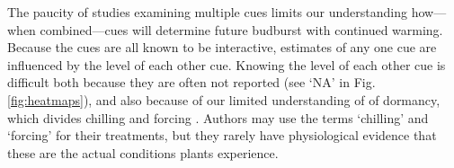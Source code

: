 \documentclass[11pt,letter]{article}
\begin{document}
The paucity of studies examining multiple cues limits our understanding how---when combined---cues will determine future budburst with continued warming. Because the cues are all known to be interactive, estimates of any one cue are influenced by the level of each other cue. Knowing the level of each other cue is difficult both because they are often not reported (see `NA' in Fig. \ref{fig:heatmaps}), and also because of our limited understanding of  of dormancy, which divides chilling and forcing \citep[][]{chuine2016}. Authors may use the terms `chilling' and `forcing' for their treatments, but they rarely have physiological evidence that these are the actual conditions plants experience. \\
\end{document}

